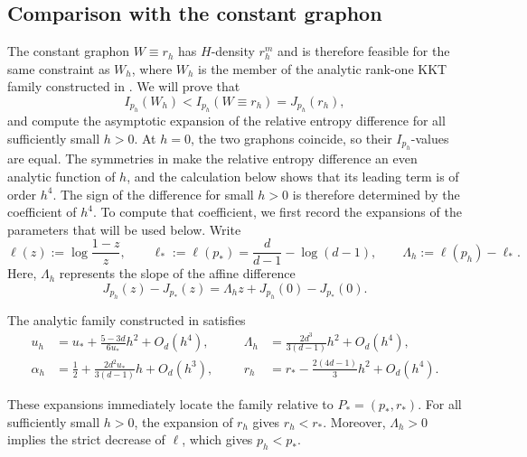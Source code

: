 \subsection{Comparison with the constant graphon}
\label{sec:constant-graphon-comparison}

The constant graphon $W\equiv r_h$ has $H$-density $r_h^m$ and is therefore
feasible for the same constraint as $W_h$, where $W_h$ is the member of the
analytic rank-one KKT family constructed in
.  We will prove that
\[
  I_{p_h}(W_h)<I_{p_h}(W\equiv r_h)=J_{p_h}(r_h),
\]
and compute the asymptotic expansion of the
relative entropy difference for all sufficiently small $h>0$.  At $h=0$, the
two graphons coincide, so their $I_{p_h}$-values are equal.  The symmetries in
 make the relative entropy difference
an even analytic function of $h$, and the calculation below shows that its
leading term is of order $h^4$.  The sign of the difference for small $h>0$ is therefore
determined by the coefficient of $h^4$.  To compute that coefficient, we
first record the expansions of the parameters that will be used below.
Write
\[
  \ell(z):=\log\frac{1-z}{z}, \qquad
  \ell_*:=\ell(p_*)=\frac d{d-1}-\log(d-1), \qquad
  \Lambda_h:=\ell(p_h)-\ell_*.
\]
Here, $\Lambda_h$ represents the slope of the affine difference
\begin{equation}\label{eq:entropy-parameter-shift}
  J_{p_h}(z)-J_{p_*}(z)=\Lambda_h z+J_{p_h}(0)-J_{p_*}(0).
\end{equation}

\begin{lemma}
\label{lem:rank-one-parameter-expansions}
The analytic family constructed in
 satisfies
\begin{equation}\label{eq:rank-one-parameter-expansions}
\begin{aligned}
  u_h&=u_*+\frac{5-3d}{6u_*}h^2+O_d(h^4),
  &&&
  \Lambda_h&=\frac{2d^3}{3(d-1)}h^2+O_d(h^4),\\
  \alpha_h&=\frac12+\frac{2d^2u_*}{3(d-1)}h+O_d(h^3),
  &&&
  r_h&=r_*-\frac{2(4d-1)}3h^2+O_d(h^4).
\end{aligned}
\end{equation}
\end{lemma}

These expansions immediately locate the family relative to
$P_*=(p_*,r_*)$.  For all sufficiently small $h>0$, the expansion of $r_h$
gives $r_h<r_*$.  Moreover, $\Lambda_h>0$ implies the strict decrease of
$\ell$, which gives $p_h<p_*$.

